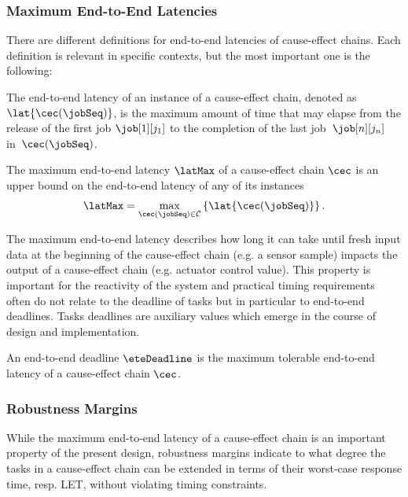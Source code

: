 \subsubsection{Maximum End-to-End Latencies}
There are different definitions for end-to-end latencies of cause-effect chains.  
Each definition is relevant in specific contexts, but the most important one is the following:
%
\begin{definition}
The end-to-end latency  of an instance of a cause-effect chain, denoted as $\lat{\cec(\jobSeq)}$, is the maximum amount of time that may elapse from the release of the first job $\job[1][j_1]$ to the completion of the last job~$\job[n][j_n]$ in~$\cec(\jobSeq)$.
\end{definition}
%
\begin{definition}
The maximum end-to-end latency $\latMax$ of a cause-effect chain $\cec$ is an upper bound on the end-to-end latency of any of its instances
\begin{align*}
	\latMax =
	\max_{\cec(\jobSeq) \in \mathcal{C}} 
	\left\{ 
	\lat{\cec(\jobSeq)} 
	\right\}.
\end{align*}
\end{definition}

The maximum end-to-end latency describes how long it can take until fresh input data at the beginning of the cause-effect chain (e.g. a sensor sample) impacts the output of a cause-effect chain (e.g. actuator control value).
This property is important for the reactivity of the system and practical timing requirements often do not  relate to the deadline of tasks but in particular to end-to-end deadlines. 
Tasks deadlines are auxiliary values which emerge in the course of design and implementation.
%
\begin{definition}
An end-to-end deadline $\eteDeadline$ is the maximum tolerable end-to-end latency of a cause-effect chain $\cec$.
\end{definition}
%


\subsubsection{Robustness Margins}
\label{sec:robustness-margins}
While the maximum end-to-end latency of a cause-effect chain is an important property of the present design, robustness margins indicate to what degree the tasks in a cause-effect chain can be extended in terms of their worst-case response time, resp. LET, without violating timing constraints. 
\bigskip

